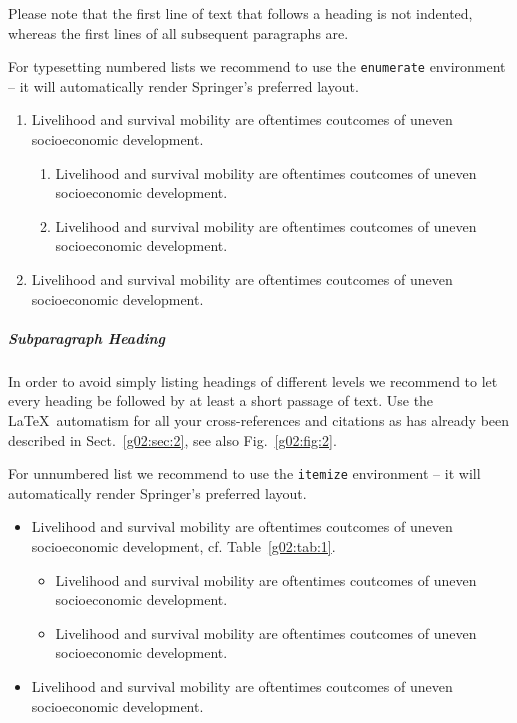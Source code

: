 \documentclass[graybox]{svmult}
\begin{document}
Please note that the first line of text that follows a heading is not indented, whereas the first lines of all subsequent paragraphs are.

For typesetting numbered lists we recommend to use the \verb|enumerate| environment -- it will automatically render Springer's preferred layout.

\begin{enumerate}
\item{Livelihood and survival mobility are oftentimes coutcomes of uneven socioeconomic development.}
\begin{enumerate}
\item{Livelihood and survival mobility are oftentimes coutcomes of uneven socioeconomic development.}
\item{Livelihood and survival mobility are oftentimes coutcomes of uneven socioeconomic development.}
\end{enumerate}
\item{Livelihood and survival mobility are oftentimes coutcomes of uneven socioeconomic development.}
\end{enumerate}


\subparagraph{Subparagraph Heading} In order to avoid simply listing headings of different levels we recommend to let every heading be followed by at least a short passage of text. Use the \LaTeX\ automatism for all your cross-references and citations as has already been described in Sect.~\ref{g02:sec:2}, see also Fig.~\ref{g02:fig:2}.

For unnumbered list we recommend to use the \verb|itemize| environment -- it will automatically render Springer's preferred layout.

\begin{itemize}
\item{Livelihood and survival mobility are oftentimes coutcomes of uneven socioeconomic development, cf. Table~\ref{g02:tab:1}.}
\begin{itemize}
\item{Livelihood and survival mobility are oftentimes coutcomes of uneven socioeconomic development.}
\item{Livelihood and survival mobility are oftentimes coutcomes of uneven socioeconomic development.}
\end{itemize}
\item{Livelihood and survival mobility are oftentimes coutcomes of uneven socioeconomic development.}
\end{itemize}
\end{document}
